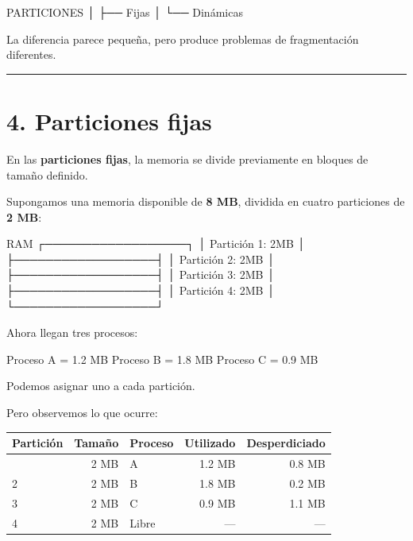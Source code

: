 \documentclass[
  spanish,
  letterpaper,
]{scrbook}
\newenvironment{Shaded}{\begin{snugshade}}{\end{snugshade}}
\newcommand{\NormalTok}[1]{\textcolor[rgb]{0.00,0.23,0.31}{#1}}
\newcounter{none} %
\begin{document}
\begin{Shaded}
\begin{Highlighting}[]
\NormalTok{PARTICIONES}
\NormalTok{   │}
\NormalTok{   ├── Fijas}
\NormalTok{   │}
\NormalTok{   └── Dinámicas}
\end{Highlighting}
\end{Shaded}

La diferencia parece pequeña, pero produce problemas de fragmentación
diferentes.

\begin{center}\rule{0.5\linewidth}{0.5pt}\end{center}


\chapter{4. Particiones fijas}\label{particiones-fijas}

En las \textbf{particiones fijas}, la memoria se divide previamente en
bloques de tamaño definido.

Supongamos una memoria disponible de \textbf{8 MB}, dividida en cuatro
particiones de \textbf{2 MB}:

\begin{Shaded}
\begin{Highlighting}[]
\NormalTok{RAM}
\NormalTok{┌──────────────────┐}
\NormalTok{│ Partición 1: 2MB │}
\NormalTok{├──────────────────┤}
\NormalTok{│ Partición 2: 2MB │}
\NormalTok{├──────────────────┤}
\NormalTok{│ Partición 3: 2MB │}
\NormalTok{├──────────────────┤}
\NormalTok{│ Partición 4: 2MB │}
\NormalTok{└──────────────────┘}
\end{Highlighting}
\end{Shaded}

Ahora llegan tres procesos:

\begin{Shaded}
\begin{Highlighting}[]
\NormalTok{Proceso A = 1.2 MB}
\NormalTok{Proceso B = 1.8 MB}
\NormalTok{Proceso C = 0.9 MB}
\end{Highlighting}
\end{Shaded}

Podemos asignar uno a cada partición.

Pero observemos lo que ocurre:

{\def\LTcaptype{none} %
\begin{longtable}[]{@{}lrlrr@{}}
\toprule\noalign{}
Partición & Tamaño & Proceso & Utilizado & Desperdiciado \\
\midrule\noalign{}
\endhead
\bottomrule\noalign{}
\endlastfoot
1 & 2 MB & A & 1.2 MB & 0.8 MB \\
2 & 2 MB & B & 1.8 MB & 0.2 MB \\
3 & 2 MB & C & 0.9 MB & 1.1 MB \\
4 & 2 MB & Libre & --- & --- \\
\end{longtable}
}
\end{document}
